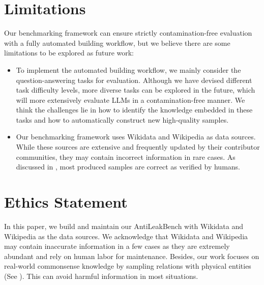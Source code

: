 \documentclass[11pt]{article}
\newcommand{\benchname}{{AntiLeakBench}\xspace}
\begin{document}
\section*{Limitations}
    Our benchmarking framework can ensure strictly contamination-free evaluation with a fully automated building workflow,
    but we believe there are some limitations to be explored as future work:
    \begin{itemize}[leftmargin=*, itemsep=2pt]
        \item
            To implement the automated building workflow,
            we mainly consider the question-answering tasks for evaluation.
            Although we have devised different task difficulty levels,
            more diverse tasks can be explored in the future, which will more extensively evaluate LLMs in a contamination-free manner.
            We think the challenges lie in how to identify the knowledge embedded in these tasks and how to automatically construct new high-quality samples.
        \item
            Our benchmarking framework uses Wikidata and Wikipedia as data sources.
            While these sources are extensive and frequently updated by their contributor communities, they may contain incorrect information in rare cases.
            As discussed in , most produced samples are correct as verified by humans.
    \end{itemize}

\section*{Ethics Statement}
    In this paper, we build and maintain our \benchname with Wikidata and Wikipedia as the data sources.
    We acknowledge that Wikidata and Wikipedia may contain inaccurate information in a few cases as they are extremely abundant and rely on human labor for maintenance.
    Besides, our work focuses on real-world commonsense knowledge by sampling relations with physical entities (See ). 
    This can avoid harmful information in most situations.






\end{document}
